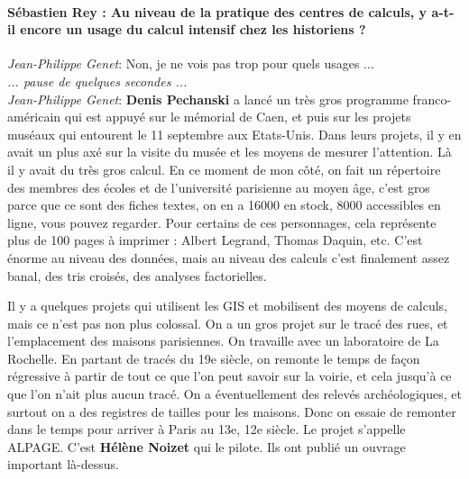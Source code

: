 \paragraph*{Sébastien Rey : Au niveau de la pratique des centres de calculs, y a-t-il encore un usage du calcul intensif chez les historiens ? }

\noindent\emph{Jean-Philippe Genet}: Non, je ne vois pas trop pour quels usages ... \\

\textit{... pause de quelques secondes ...}
\\
\noindent\emph{Jean-Philippe Genet}: \textbf{Denis Pechanski} a lancé un très gros programme franco-américain qui est appuyé sur le mémorial de Caen, et puis sur les projets muséaux qui entourent le 11 septembre aux Etats-Unis. Dans leurs projets, il y en avait un plus axé sur la visite du musée et les moyens de mesurer l'attention. Là il y avait du très gros calcul. En ce moment de mon côté, on fait un répertoire des membres des écoles et de l'université parisienne au moyen âge, c'est gros parce que ce sont des fiches textes, on en a 16000 en stock, 8000 accessibles en ligne, vous pouvez regarder. Pour certains de ces personnages, cela représente plus de 100 pages à imprimer : Albert Legrand, Thomas Daquin, etc. C'est énorme au niveau des données, mais au niveau des calculs c'est finalement assez banal,  des tris croisés, des analyses factorielles. 

Il y a quelques projets qui utilisent les GIS et mobilisent des moyens de calculs, mais ce n'est pas non plus colossal. On a un gros projet sur le tracé des rues, et l'emplacement des maisons parisiennes. On travaille avec un laboratoire de La Rochelle. En partant de tracés du 19e siècle, on remonte le temps de façon régressive à partir de tout ce que l'on peut savoir sur la voirie, et cela jusqu'à ce que l'on n’ait plus aucun tracé.  On a éventuellement des relevés archéologiques, et surtout on a des registres de tailles pour les maisons. Donc on essaie de remonter dans le temps pour arriver à Paris au 13e, 12e siècle. Le projet s'appelle ALPAGE. C'est \textbf{Hélène Noizet} qui le pilote. Ils ont publié un ouvrage important là-dessus. 

